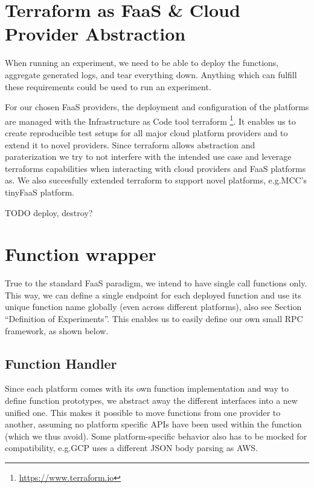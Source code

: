 \documentclass[../main.tex]{subfiles}
\begin{document}
\section{Terraform as FaaS \& Cloud Provider Abstraction}%
\label{sec:terraform}

When running an experiment, we need to be able to deploy the functions, aggregate generated logs, and tear everything down. 
Anything which can fulfill these requirements could be used to run an experiment.

For our chosen FaaS providers, the deployment and configuration of the platforms are managed with the Infrastructure as Code tool terraform%
\footnote{\url{https://www.terraform.io}}. 
It enables us to create reproducible test setups for all major cloud platform providers and to extend it to novel providers. 
Since terraform allows abstraction and paraterization we try to not interfere with the intended use case and 
leverage terraforms capabilities when interacting with cloud providers and FaaS platforms as.
We also succesfully extended terraform to support novel platforms, e.g.\@ MCC's tinyFaaS platform.

TODO deploy, destroy?

\section{Function wrapper}%
\label{sec:designFunctionWrapper}

True to the standard FaaS paradigm, we intend to have single call functions only. 
This way, we can define a single endpoint for each deployed function and use its unique function name globally 
(even across different platforms), also see Section ``Definition of Experiments''. 
This enables us to easily define our own small RPC framework, as shown below.

\subsection{Function Handler}%
\label{sub:designFunctionHandler}

Since each platform comes with its own function implementation and way to define function prototypes, 
we abstract away the different interfaces into a new unified one. 
This makes it possible to move functions from one provider to another, 
assuming no platform specific APIs have been used within the function (which we thus avoid). 
Some platform-specific behavior also has to be mocked for compatibility, 
e.g.\@ GCP uses a different JSON body parsing as AWS.\@
\end{document}
